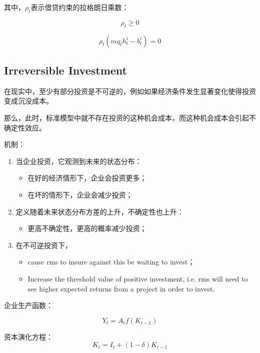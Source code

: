 \documentclass[cn,10pt,math=newtx,citestyle=gb7714-2015,bibstyle=gb7714-2015]{elegantbook}
\begin{document}
其中，$\rho_t$表示借贷约束的拉格朗日乘数：

\begin{equation}\label{label}
	\rho_t\ge0
\end{equation}

\begin{equation}\label{label}
	\rho_t(mq_th_t^i-b_t^i)=0
\end{equation}

\subsection{Irreversible Investment}

在现实中，至少有部分投资是不可逆的，例如如果经济条件发生显著变化使得投资变成沉没成本。

那么，此时，标准模型中就不存在投资的这种机会成本，而这种机会成本会引起不确定性效应。

机制：
\begin{enumerate}
	\item 当企业投资，它观测到未来的状态分布：
	\begin{itemize}
		\item 在好的经济情形下，企业会投资更多；
		\item 在坏的情形下，企业会减少投资；
	\end{itemize}
	\item 定义随着未来状态分布方差的上升，不确定性也上升：
	\begin{itemize}
		\item 更高不确定性，更高的概率减少投资；
	\end{itemize}
	\item 在不可逆投资下，
	\begin{itemize}
		\item cause rms to insure against this be waiting to invest；
		\item Increase the threshold value of positive investment, i.e. rms will need to see higher expected returns from a project in order to invest.
	\end{itemize}
\end{enumerate}

企业生产函数：

\begin{equation}\label{label}
	Y_t=A_tf(K_{t-1})
\end{equation}

资本演化方程：
\begin{equation}\label{label}
	K_t=I_t+(1-\delta)K_{t-1}
\end{equation}
\end{document}
